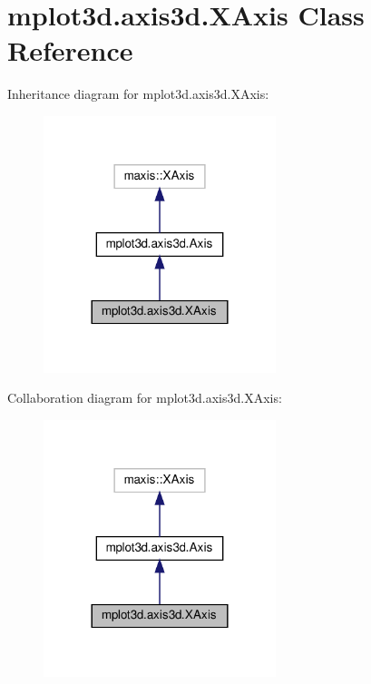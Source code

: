 \hypertarget{classmplot3d_1_1axis3d_1_1XAxis}{}\section{mplot3d.\+axis3d.\+X\+Axis Class Reference}
\label{classmplot3d_1_1axis3d_1_1XAxis}


Inheritance diagram for mplot3d.\+axis3d.\+X\+Axis\+:
\nopagebreak
\begin{figure}[H]
\begin{center}
\leavevmode
\includegraphics[width=192pt]{classmplot3d_1_1axis3d_1_1XAxis__inherit__graph}
\end{center}
\end{figure}


Collaboration diagram for mplot3d.\+axis3d.\+X\+Axis\+:
\nopagebreak
\begin{figure}[H]
\begin{center}
\leavevmode
\includegraphics[width=192pt]{classmplot3d_1_1axis3d_1_1XAxis__coll__graph}
\end{center}
\end{figure}
